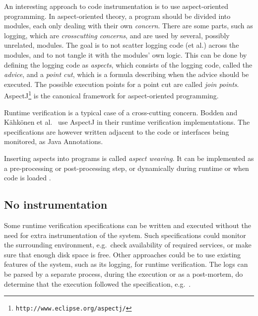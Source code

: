 An interesting approach to code instrumentation is to use aspect-oriented
programming. In aspect-oriented theory, a program should be divided into
modules, each only dealing with their own \textit{concern}. There are some
parts, such as logging, which are \textit{crosscutting concerns}, and are used
by several, possibly unrelated, modules. The goal is to not scatter logging
code (et al.) across the modules, and to not tangle it with the modules' own
logic. This can be done by defining the logging code as \textit{aspects}, which
consists of the logging code, called the \textit{advice}, and a \textit{point
cut}, which is a formula describing when the advice should be executed. The
possible execution points for a point cut are called \textit{join points}.
AspectJ\footnote{\texttt{http://www.eclipse.org/aspectj/}} is the canonical
framework for aspect-oriented programming.

Runtime verification is a typical case of a cross-cutting concern. Bodden
\cite{bodden05efficientrv} and Kähkönen et al.\ \cite{kahkonen09lime} use
AspectJ in their runtime verification implementations. The specifications are
however written adjacent to the code or interfaces being monitored, as Java
Annotations.

Inserting aspects into programs is called \textit{aspect weaving}. It can be
implemented as a pre-processing or post-processing step, or dynamically during
runtime or when code is loaded \cite{kiczales01aspect, matusiak09aoppy}.


\subsection{No instrumentation}

Some runtime verification specifications can be written and executed without
the need for extra instrumentation of the system. Such specifications could
monitor the surrounding environment, e.g.\ check availability of required
services, or make sure that enough disk space is free. Other approaches could be
to use existing features of the system, such as its logging, for runtime
verification. The logs can be parsed by a separate process, during the
execution or as a post-mortem, do determine that the execution followed the
specification, e.g.\ \cite{barringer09tutorial}.


